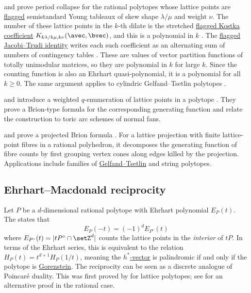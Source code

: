  and  prove period
collapse for the rational polytopes whose lattice points are
\hyperref[flaggedSchurPolynomialDefinition]{flagged} semistandard Young
tableaux of skew shape $\lambda/\mu$ and weight $\nu$.  The number of these
lattice points in the $k$-th dilate is the stretched
\hyperref[flaggedKostkaCoefficientDefinition]{flagged Kostka coefficient}
$K_{k\lambda/k\mu,k\nu}(\avec,\bvec)$, and this is a polynomial in $k$
\cite[Cor.~36]{AlexanderssonOguz2023x}.
The \hyperref[flaggedSchurPolynomialJacobiTrudi]{flagged Jacobi--Trudi
identity} writes each such coefficient as an alternating sum of numbers of
contingency tables \cite[Prop.~34]{AlexanderssonOguz2023x}.  These are
values of vector partition functions of totally unimodular matrices, so they
are polynomial in $k$ for large $k$.  Since the counting function is also an
Ehrhart quasi-polynomial, it is a polynomial for all $k\geq 0$.  The same
argument applies to cylindric Gelfand--Tsetlin polytopes
\cite[Cor.~41]{AlexanderssonOguz2023x}.

 and  introduce a weighted
$q$-enumeration of lattice points in a polytope \cite{AndersonShah2023x}.
They prove a Brion-type formula for the corresponding generating function and
relate the construction to toric arc schemes of normal fans.

 and  prove a projected Brion
formula \cite{DuprazMonin2026x}. For a lattice projection with finite
lattice-point fibres in a rational polyhedron, it decomposes the generating
function of fibre counts by first grouping vertex cones along edges killed
by the projection. Applications include families of
\hyperref[gtpolytopes]{Gelfand--Tsetlin} and string polytopes.


\subsection[ehrhartMacdonaldReciprocity]{Ehrhart--Macdonald reciprocity}

Let $P$ be a $d$-dimensional rational polytope with Ehrhart polynomial
$E_P(t)$.
The  states that
\[
	E_P(-t) = (-1)^d E_{P^\circ}(t)
\]
where $E_{P^\circ}(t) = |t P^\circ \cap \setZ^d|$ counts the lattice points
in the \emph{interior} of $tP$.
In terms of the Ehrhart series, this is equivalent to the relation
$H_P(t) = t^{d+1} H_P(1/t)$, meaning the
\hyperref[hStarVector]{$h^*$-vector} is palindromic if and
only if the polytope is \hyperref[gorenstein]{Gorenstein}.
The reciprocity can be seen as a discrete analogue of Poincar\'e duality.
This was first proved by  \cite{Macdonald1971} for
lattice polytopes; see \cite{Beck2007} for an alternative proof in the
rational case.



